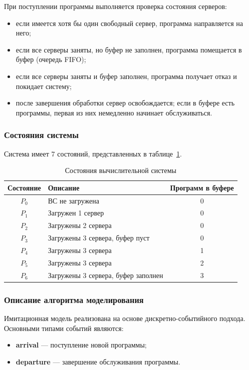 \documentclass[14pt,a4paper]{extarticle}
\begin{document}
При поступлении программы выполняется проверка состояния серверов:
\begin{itemize}
  \item если имеется хотя бы один свободный сервер, программа направляется на него;
  \item если все серверы заняты, но буфер не заполнен, программа помещается в
        буфер (очередь FIFO);
  \item если все серверы заняты и буфер заполнен, программа получает отказ и
        покидает систему;
  \item после завершения обработки сервер освобождается; если в буфере есть
        программы, первая из них немедленно начинает обслуживаться.
\end{itemize}

\subsubsection*{Состояния системы}

Система имеет 7 состояний, представленных в таблице~\ref{tab:states}.

\begin{table}[H]
\centering
\caption{Состояния вычислительной системы}
\label{tab:states}
\begin{tabular}{clc}
\toprule
Состояние & Описание & Программ в буфере \\
\midrule
$P_0$ & ВС не загружена & 0 \\
$P_1$ & Загружен 1 сервер & 0 \\
$P_2$ & Загружены 2 сервера & 0 \\
$P_3$ & Загружены 3 сервера, буфер пуст & 0 \\
$P_4$ & Загружены 3 сервера & 1 \\
$P_5$ & Загружены 3 сервера & 2 \\
$P_6$ & Загружены 3 сервера, буфер заполнен & 3 \\
\bottomrule
\end{tabular}
\end{table}

\subsubsection*{Описание алгоритма моделирования}

Имитационная модель реализована на основе дискретно-событийного подхода.
Основными типами событий являются:
\begin{itemize}
  \item \textbf{arrival} --- поступление новой программы;
  \item \textbf{departure} --- завершение обслуживания программы.
\end{itemize}
\end{document}
